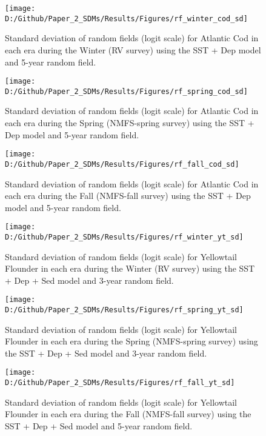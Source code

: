 \documentclass[
]{article}
\begin{document}
\begin{landscape}
\newpage

\begin{figure}
\texttt{[image: D:/Github/Paper\_2\_SDMs/Results/Figures/rf\_winter\_cod\_sd]} \caption{Standard deviation of random fields (logit scale) for Atlantic Cod  in each era during the Winter (RV survey) using the SST + Dep model and 5-year random field.}\label{fig:rf-winter-cod-sd}
\end{figure}

\newpage
\begin{figure}
\texttt{[image: D:/Github/Paper\_2\_SDMs/Results/Figures/rf\_spring\_cod\_sd]} \caption{Standard deviation of random fields (logit scale) for Atlantic Cod  in each era during the Spring (NMFS-spring survey) using the SST + Dep model and 5-year random field.}\label{fig:rf-spring-cod-sd}
\end{figure}

\newpage
\begin{figure}
\texttt{[image: D:/Github/Paper\_2\_SDMs/Results/Figures/rf\_fall\_cod\_sd]} \caption{Standard deviation of random fields (logit scale) for Atlantic Cod  in each era during the Fall (NMFS-fall survey) using the SST + Dep model and 5-year random field.}\label{fig:rf-fall-cod-sd}
\end{figure}

\newpage
\begin{figure}
\texttt{[image: D:/Github/Paper\_2\_SDMs/Results/Figures/rf\_winter\_yt\_sd]} \caption{Standard deviation of random fields (logit scale) for Yellowtail Flounder in each era during the Winter (RV survey) using the SST + Dep + Sed model and 3-year random field.}\label{fig:rf-winter-yt-sd}
\end{figure}

\newpage
\begin{figure}
\texttt{[image: D:/Github/Paper\_2\_SDMs/Results/Figures/rf\_spring\_yt\_sd]} \caption{Standard deviation of random fields (logit scale) for Yellowtail Flounder in each era during the Spring (NMFS-spring survey) using the SST + Dep + Sed model and 3-year random field.}\label{fig:rf-spring-yt-sd}
\end{figure}

\newpage
\begin{figure}
\texttt{[image: D:/Github/Paper\_2\_SDMs/Results/Figures/rf\_fall\_yt\_sd]} \caption{Standard deviation of random fields (logit scale) for Yellowtail Flounder in each era during the Fall (NMFS-fall survey) using the SST + Dep + Sed model and 5-year random field.}\label{fig:rf-fall-yt-sd}
\end{figure}
\end{landscape}
\end{document}
